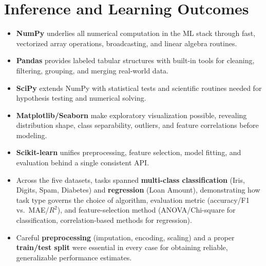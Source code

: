 \documentclass[11pt,a4paper]{article}
\begin{document}
\section{Inference and Learning Outcomes}
\begin{itemize}
  \item \textbf{NumPy} underlies all numerical computation in the ML stack through fast, vectorized
        array operations, broadcasting, and linear algebra routines.
  \item \textbf{Pandas} provides labeled tabular structures with built-in tools for cleaning, filtering,
        grouping, and merging real-world data.
  \item \textbf{SciPy} extends NumPy with statistical tests and scientific routines needed for
        hypothesis testing and numerical solving.
  \item \textbf{Matplotlib/Seaborn} make exploratory visualization possible, revealing distribution
        shape, class separability, outliers, and feature correlations before modeling.
  \item \textbf{Scikit-learn} unifies preprocessing, feature selection, model fitting, and evaluation
        behind a single consistent API.
  \item Across the five datasets, tasks spanned \textbf{multi-class classification} (Iris, Digits,
        Spam, Diabetes) and \textbf{regression} (Loan Amount), demonstrating how task type governs the
        choice of algorithm, evaluation metric (accuracy/F1 vs.\ MAE/$R^2$), and feature-selection
        method (ANOVA/Chi-square for classification, correlation-based methods for regression).
  \item Careful \textbf{preprocessing} (imputation, encoding, scaling) and a proper
        \textbf{train/test split} were essential in every case for obtaining reliable, generalizable
        performance estimates.
\end{itemize}
\end{document}
